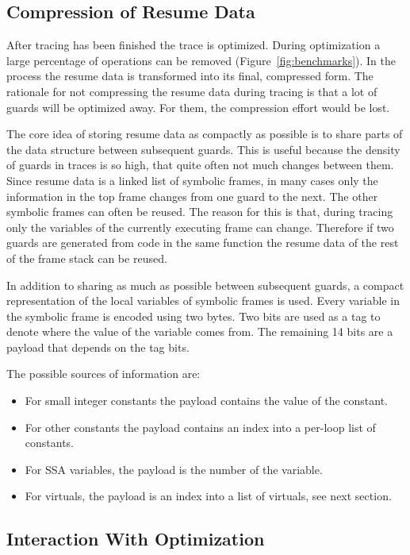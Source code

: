\documentclass[10pt,preprint]{sigplanconf}
\begin{document}
\subsection{Compression of Resume Data}
\label{sub:compression}

After tracing has been finished the trace is optimized.
During optimization a large percentage of operations can be removed (Figure~\ref{fig:benchmarks}).
In the process the resume data is transformed into its final, compressed form.
The rationale for not compressing the resume data during tracing
is that a lot of guards will be optimized away.
For them, the compression effort would be lost.

The core idea of storing resume data as compactly as possible
is to share parts of the data structure between subsequent guards.
This is useful because the density of guards in traces is so high,
that quite often not much changes between them.
Since resume data is a linked list of symbolic frames,
in many cases only the information in the top frame changes from one guard to the next.
The other symbolic frames can often be reused.
The reason for this is that, during tracing only the variables
of the currently executing frame can change.
Therefore if two guards are generated from code in the same function
the resume data of the rest of the frame stack can be reused.

In addition to sharing as much as possible between subsequent guards,
a compact representation of the local variables of symbolic frames is used.
Every variable in the symbolic frame is encoded using two bytes.
Two bits are used as a tag to denote where the value of the variable
comes from.
The remaining 14 bits are a payload that depends on the tag bits.

The possible sources of information are:

\begin{itemize}
    \item For small integer constants
        the payload contains the value of the constant.
    \item For other constants
        the payload contains an index into a per-loop list of constants.
    \item For SSA variables,
        the payload is the number of the variable.
    \item For virtuals,
        the payload is an index into a list of virtuals, see next section.
\end{itemize}

\subsection{Interaction With Optimization}
\label{sub:optimization}
\end{document}
